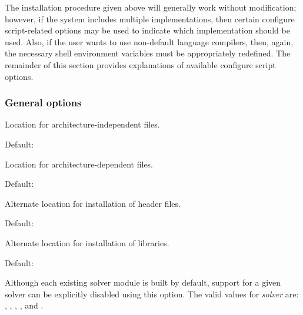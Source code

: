 The installation procedure given above will generally work without modification;
however, if the system includes multiple {\mpi} implementations, then certain
configure script-related options may be used to indicate which {\mpi}
implementation should be used. Also, if the user wants to use non-default
language compilers, then, again, the necessary shell environment variables must
be appropriately redefined.
The remainder of this section provides explanations of available configure script
options.


\subsubsection*{General options}


\begin{config}
  
\item {}
  
  Location for architecture-independent files.
  
  Default: 
  
\item {}

  Location for architecture-dependent files.
  
  Default: 

\item {}
  
  Alternate location for installation of header files.
  
  Default: 
  
\item {}
  
  Alternate location for installation of libraries.
  
  Default: 

\item {}

  Although each existing solver module is built by default, support for a
  given solver can be explicitly disabled using this option. 
  The valid values for {\em solver} are: , , 
  , , and .

\item {}
  

\end{config}
